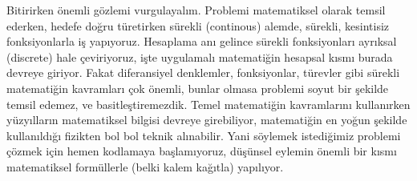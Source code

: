 \documentclass[12pt,fleqn]{article}\usepackage{../../common}
\begin{document}
Bitirirken önemli gözlemi vurgulayalım. Problemi matematiksel olarak temsil
ederken, hedefe doğru türetirken sürekli (continous) alemde, sürekli,
kesintisiz fonksiyonlarla iş yapıyoruz. Hesaplama anı gelince sürekli
fonksiyonları ayrıksal (discrete) hale çeviriyoruz, işte uygulamalı
matematiğin hesapsal kısmı burada devreye giriyor. Fakat diferansiyel
denklemler, fonksiyonlar, türevler gibi sürekli matematiğin kavramları çok
önemli, bunlar olmasa problemi soyut bir şekilde temsil edemez, ve
basitleştiremezdik. Temel matematiğin kavramlarını kullanırken yüzyılların
matematiksel bilgisi devreye girebiliyor, matematiğin en yoğun şekilde
kullanıldığı fizikten bol bol teknik alınabilir. Yani söylemek istediğimiz
problemi çözmek için hemen kodlamaya başlamıyoruz, düşünsel eylemin önemli
bir kısmı matematiksel formüllerle (belki kalem kağıtla) yapılıyor.
\end{document}
